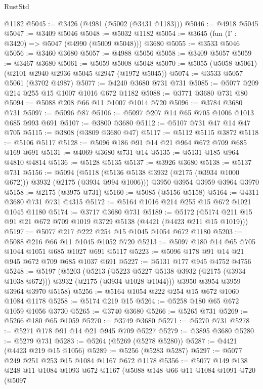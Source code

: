 \begin{lexlean}{RustStd}
\begin{coremodule}
    @1182
@5045 := @3426 (@4981 (@5002 (@3431 @1183)))
@5046 := @4918 @5045
@5047 := @3409 @5046
@5048 := @5032 @1182
@5054 := @3645 (fun (Γ : @3420) => @5047 (@4990 (@5009 @5048))) @3680
@5055 := @3533 @5046
@5056 := @3460 @3680
@5057 := @4988 @5056
@5058 := @3409 @5057
@5059 := @3467 @3680
@5061 := @5059 @5008 @5048
@5070 := @5055 (@5058 @5061) (@2101 @2940 @2936 @5045 @2947 (@1972 @5045))
@5074 := @3533 @5057 @5061 (@3702 @4987)
@5077 := @4240 @3680 @731 @731
@5085 := @5077 @209 @214 @255 @15 @1007 @1016 @672 @1182
@5088 := @3771 @3680 @731 @80
@5094 := @5088 @208 @66 @11 @1007 @1014 @720
@5096 := @3784 @3680 @731
@5097 := @5096 @87
@5106 := @5097 @207 @14 @65 @705 @1006 @1013 @685 @993 @691
@5107 := @3800 @3680
@5112 := @5107 @731 @47 @14 @47 @705
@5115 := @3808 (@3809 @3680 @47)
@5117 := @5112 @5115 @3872
@5118 := @5106 @5117
@5128 := @5096 @186 @91 @14 @21 @964 @672 @709 @685 @169 @691
@5131 := @4069 @3680 @731 @14
@5135 := @5131 @185 @964 @4810 @4814
@5136 := @5128 @5135
@5137 := @3926 @3680
@5138 := @5137 @731
@5156 := @5094
    (@5118 (@5136 @5138 @3932 (@2175 (@3934 @1000 @672))) @3932 (@2175 (@3934 @994 @1006)))
    @3950
    @3954
    @3959
    @3964
    @3970
@5158 := @2175 (@3975 @731)
@5160 := @5085 (@5156 @5158)
@5164 := @4311 @3680 @731 @731 @4315
@5172 := @5164 @1016 @214 @255 @15 @672 @1021 @1045 @1180
@5174 := @3717 @3680 @731
@5189 := @5172 (@5174 @211 @15 @91 @21 @672 @709 @1019 @3729 @5138 (@4421 (@4423 @211 @15 @1019)))
@5197 := @5077 @217 @222 @254 @15 @1045 @1054 @672 @1180
@5203 := @5088 @216 @66 @11 @1045 @1052 @720
@5213 := @5097 @180 @14 @65 @705 @1044 @1051 @685 @1027 @691 @5117
@5223 := @5096 @178 @91 @14 @21 @945 @672 @709 @685 @1037 @691
@5227 := @5131 @177 @945 @4752 @4756
@5248 := @5197
    (@5203
      (@5213 (@5223 @5227 @5138 @3932 (@2175 (@3934 @1038 @672))) @3932 (@2175 (@3934 @1028 @1044)))
      @3950
      @3954
      @3959
      @3964
      @3970
      @5158)
@5256 := @5164 @1054 @222 @254 @15 @672 @1060 @1084 @1178
@5258 := @5174 @219 @15
@5264 := @5258 @180 @65 @672 @1059 @1056 @3730
@5265 := @3740 @3680
@5266 := @5265 @731
@5269 := @5266 @180 @65 @1059
@5270 := @3749 @3680
@5271 := @5270 @731
@5278 := @5271 @178 @91 @14 @21 @945 @709 @5227
@5279 := @3895 @3680
@5280 := @5279 @731
@5283 := @5264 (@5269 (@5278 @5280))
@5287 := @4421 (@4423 @219 @15 @1056)
@5289 := @5256 (@5283 @5287)
@5297 := @5077 @249 @251 @253 @15 @1084 @1167 @672 @1178
@5356 := @5077
    @149
    @138
    @248
    @11
    @1084
    @1093
    @672
    @1167
    (@5088
      @148
      @66
      @11
      @1084
      @1091
      @720
      (@5097

\end{coremodule}
\end{lexlean}
